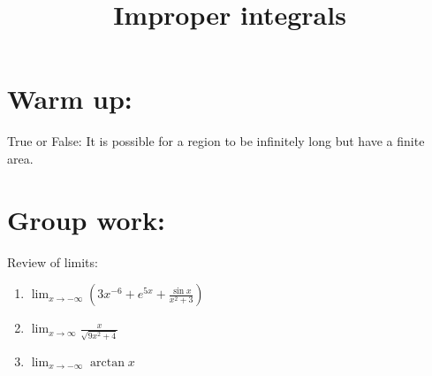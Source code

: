 \documentclass[]{ximera}
\title{Improper integrals}
\begin{document}
\begin{abstract}		\end{abstract}
\maketitle



\section{Warm up:}
True or False:  It is possible for a region to be infinitely long but have a finite area.
	\begin{freeResponse}
	
	\end{freeResponse}
	
\begin{instructorNotes}

\end{instructorNotes}








\section{Group work:}



\begin{problem}
Review of limits:
	\begin{enumerate}
	
	\item  $\lim_{x \to -\infty} \left( 3x^{-6} + e^{5x} + \frac{\sin x}{x^2 + 3} \right)$
	\begin{freeResponse}
	
	\end{freeResponse}
	
	
	
	\item  $\lim_{x \to \infty} \frac{x}{\sqrt{9x^2+4}}$
	\begin{freeResponse}
	
	\end{freeResponse}
	
	
	
	\item  $\lim_{x \to -\infty} \arctan x$
	\begin{freeResponse}
	
	\end{freeResponse}
	
	\end{enumerate}
		
\end{problem}
\end{document}
